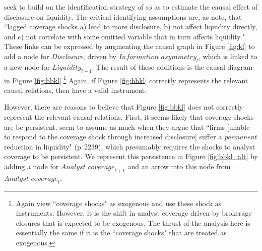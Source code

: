 \documentclass[11pt,reqno,titlepage]{amsart}
\begin{document}
\begin{doublespace}
\citet{Balakrishnan:2014js} seek to build on the identification strategy of  \citet{Kelly:2012ih} so  as to estimate the causal effect of disclosure on liquidity.
The critical identifying assumptions are, as \citet{Balakrishnan:2014js}  note, that ``lagged coverage shocks a) lead to more disclosure, b) not affect liquidity directly, and c) not correlate with some omitted variable that in turn affects liquidity."
These links can be expressed by augmenting the causal graph in Figure \ref{fig:kl} to add a node for \textit{Disclosure}, driven by $\textit{Information asymmetry}_t$, which is linked to a new node for $\textit{Liquidity}_{t+1}$. 
The result of these additions is the causal diagram in  Figure \ref{fig:bbkl}.\footnote{
 Again \citet{Balakrishnan:2014js} view ``coverage shocks" as exogenous and use these shock as instruments. However, it is the shift in analyst coverage driven by brokerage closures that is expected to be exogenous.
The thrust of the analysis here is essentially the same if it is the ``coverage shocks" that are treated as exogenous.}
Again, if Figure \ref{fig:bbkl} correctly represents the relevant causal relations, then \citet{Balakrishnan:2014js} have a valid instrument.

However, there are reasons to believe that Figure \ref{fig:bbkl} does not correctly represent the relevant causal relations.
First, it seems likely that coverage shocks are be persistent. \citet{Balakrishnan:2014js} seem to  assume as much when they argue that ``firms [unable to respond  to the coverage shock through increased disclosure] suffer a \emph{permanent} reduction in liquidity" (p.\,2239), which presumably requires the shocks to analyst coverage to be persistent.
We represent this persistence in Figure \ref{fig:bbkl_alt} by adding a node for $\textit{Analyst coverage}_{t+1}$ and an arrow into this node from $\textit{Analyst coverage}_t$.


\end{doublespace}
\end{document}
